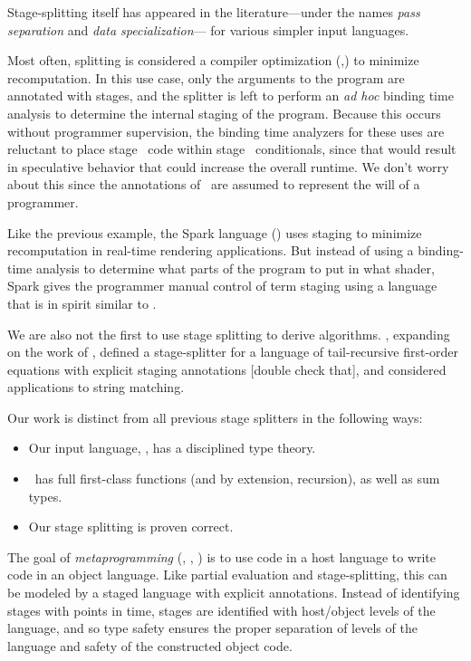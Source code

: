 Stage-splitting itself has appeared in the literature---under 
the names {\em pass separation} and {\em data specialization}--- for various simpler input languages.

Most often, splitting is considered a compiler optimization (\cite{jorring86},\cite{knoblock96})
to minimize recomputation.
In this use case, only the arguments to the program are annotated with stages, 
and the splitter is left to perform an {\em ad hoc} binding time analysis to determine the 
internal staging of the program.
Because this occurs without programmer supervision, the binding time analyzers for these uses are 
reluctant to place stage \bbone\ code within stage \bbtwo\ conditionals, 
since that would result in speculative behavior that could increase the overall runtime.
We don't worry about this since the annotations of \lang\ are assumed to represent the will of a programmer.

Like the previous example, the Spark language (\cite{sparkThesis}) uses staging to minimize recomputation in real-time rendering applications.  
But instead of using a binding-time analysis to determine what parts of the program to put in what shader, 
Spark gives the programmer manual control of term staging using a language that is in spirit similar to \lang. 

We are also not the first to use stage splitting to derive algorithms.
\cite{malmkjaer89}, expanding on the work of \cite{barzdins88}, defined a stage-splitter
for a language of tail-recursive first-order equations with explicit staging annotations [double check that],
and considered applications to string matching.

Our work is distinct from all previous stage splitters in the following ways:
\begin{itemize}
\item Our input language, \lang, has a disciplined type theory.
\item \lang\ has full first-class functions (and by extension, recursion), as well as sum types.
\item Our stage splitting is proven correct.
\end{itemize}

The goal of {\em metaprogramming} (\cite{taha-thesis-99}, \cite{devito13}, \cite{davies01}) is 
to use code in a host language to write code in an object language.
Like partial evaluation and stage-splitting, this can be modeled by a staged language with explicit annotations.
Instead of identifying stages with points in time, stages are identified with host/object levels of the language,
and so type safety ensures the proper separation of levels of the language and safety of the constructed object code.

